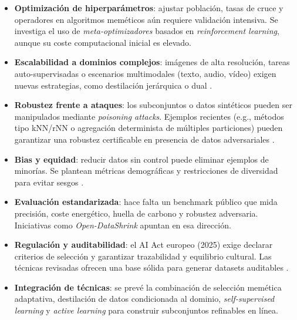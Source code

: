 \begin{itemize}
      \item \textbf{Optimización de hiperparámetros}: ajustar población, tasas de cruce y operadores en algoritmos meméticos aún requiere validación intensiva.
            Se investiga el uso de \textit{meta-optimizadores} basados en \textit{reinforcement learning}, aunque su coste computacional inicial es elevado.

      \item \textbf{Escalabilidad a dominios complejos}: imágenes de alta resolución, tareas auto-supervisadas o escenarios multimodales (texto, audio, vídeo) exigen nuevas estrategias, como destilación jerárquica o dual \cite{liGenerativeDatasetDistillation2024a, liGenerativeDatasetDistillation2024}.

      \item \textbf{Robustez frente a ataques}: los subconjuntos o datos sintéticos pueden ser manipulados mediante \textit{poisoning attacks}.
            Ejemplos recientes (e.g., métodos tipo kNN/rNN o agregación determinista de múltiples particiones) pueden garantizar una robustez certificable en presencia de datos adversariales \cite{jiaCertifiedRobustnessNearest2021, wangImprovedCertifiedDefenses2022}.

      \item \textbf{Bias y equidad}: reducir datos sin control puede eliminar ejemplos de minorías.
            Se plantean métricas demográficas y restricciones de diversidad para evitar sesgos \cite{buolamwiniGenderShadesIntersectional}.

      \item \textbf{Evaluación estandarizada}: hace falta un benchmark público que mida precisión, coste energético, huella de carbono y robustez adversaria.
            Iniciativas como \textit{Open-DataShrink} apuntan en esa dirección.

      \item \textbf{Regulación y auditabilidad}: el AI Act europeo (2025) exige declarar criterios de selección y garantizar trazabilidad y equilibrio cultural.
            Las técnicas revisadas ofrecen una base sólida para generar datasets auditables \cite{RegulationEU20242024}.

      \item \textbf{Integración de técnicas}: se prevé la combinación de selección memética adaptativa, destilación de datos condicionada al dominio, \textit{self-supervised learning} y \textit{active learning} para construir subconjuntos refinables en línea.
\end{itemize}